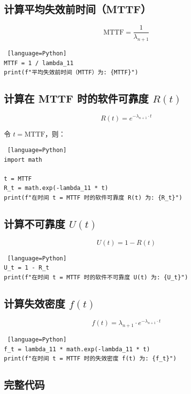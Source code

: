 \subsection*{计算平均失效前时间（MTTF）}

\[
\text{MTTF} = \frac{1}{\lambda_{n+1}}
\]

\begin{lstlisting} [language=Python]
MTTF = 1 / lambda_11
print(f"平均失效前时间（MTTF）为: {MTTF}")
\end{lstlisting}

\subsection*{计算在 MTTF 时的软件可靠度 \( R(t) \)}

\[
R(t) = e^{-\lambda_{n+1} \cdot t}
\]

令 \( t = \text{MTTF} \)，则：

\begin{lstlisting} [language=Python]
import math

t = MTTF
R_t = math.exp(-lambda_11 * t)
print(f"在时间 t = MTTF 时的软件可靠度 R(t) 为: {R_t}")
\end{lstlisting}

\subsection*{计算不可靠度 \( U(t) \)}

\[
U(t) = 1 - R(t)
\]

\begin{lstlisting} [language=Python]
U_t = 1 - R_t
print(f"在时间 t = MTTF 时的软件不可靠度 U(t) 为: {U_t}")
\end{lstlisting}

\subsection*{计算失效密度 \( f(t) \)}

\[
f(t) = \lambda_{n+1} \cdot e^{-\lambda_{n+1} \cdot t}
\]

\begin{lstlisting} [language=Python]
f_t = lambda_11 * math.exp(-lambda_11 * t)
print(f"在时间 t = MTTF 时的失效密度 f(t) 为: {f_t}")
\end{lstlisting}

\subsection*{完整代码}

